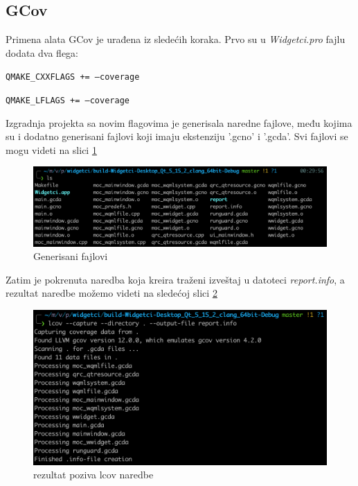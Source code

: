 \documentclass[a4paper]{article}
\begin{document}
\subsection{GCov}
Primena alata GCov je urađena iz sledećih koraka.
Prvo su u \textit{Widgetci.pro} fajlu dodata dva flega:

\begin{itemsize}
    \item \texttt{QMAKE\_CXXFLAGS += --coverage}
    \item \texttt{QMAKE\_LFLAGS += --coverage}
\end{itemsize}

\newpage
Izgradnja projekta sa novim flagovima je generisala naredne fajlove, među kojima su i dodatno generisani fajlovi koji imaju ekstenziju '.gcno' i '.gcda'. Svi fajlovi se mogu videti na slici 
\ref{fig: GCov-00}

\begin{figure}[h!]
\begin{center}
\includegraphics[scale=0.45]{GCov-00.png}
\end{center}
\caption{Generisani fajlovi}
\label{fig: GCov-00}
\end{figure}

Zatim je pokrenuta naredba koja kreira traženi izveštaj u datoteci \textit{report.info}, a rezultat naredbe možemo videti na sledećoj slici \ref{fig: GCov-01}

\begin{figure}[h!]
\begin{center}
\includegraphics[scale=0.45]{GCov-01.png}
\end{center}
\caption{rezultat poziva lcov naredbe}
\label{fig: GCov-01}
\end{figure}
\end{document}
